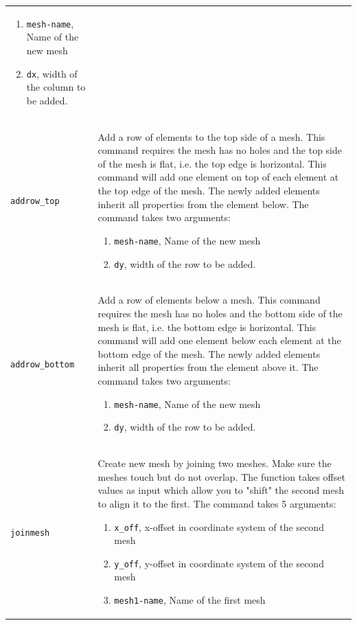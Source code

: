 \documentclass[noshowpacs,preprintnumbers,amsmath,amssymb, letter]{revtex4}
\begin{document}
\begin{longtable}{p{}p{}}
\begin{enumerate}
\item \texttt{mesh-name}, Name of the new mesh
\item \texttt{dx}, width of the column to be added. 
\end{enumerate}\\
\texttt{addrow\_top} 	& Add a row of elements to the top side of a mesh. This command requires the mesh has no holes and the top side of the mesh is flat, i.e. the top edge is horizontal. This command will add one element on top of each element at the top edge of the mesh. The newly added elements inherit all properties from the element below. The command takes two arguments:
\begin{enumerate}
\item \texttt{mesh-name}, Name of the new mesh
\item \texttt{dy}, width of the row to be added. 
\end{enumerate}\\
\texttt{addrow\_bottom} 	& Add a row of elements below a mesh. This command requires the mesh has no holes and the bottom side of the mesh is flat, i.e. the bottom edge is horizontal. This command will add one element below each element at the bottom edge of the mesh. The newly added elements inherit all properties from the element above it. The command takes two arguments:
\begin{enumerate}
\item \texttt{mesh-name}, Name of the new mesh
\item \texttt{dy}, width of the row to be added. 
\end{enumerate}\\
\texttt{joinmesh}	& Create new mesh by joining two meshes. Make sure the meshes touch but do not overlap. The function takes offset values as input which allow you to "shift" the second mesh to align it to the first. The command takes 5 arguments:
\begin{enumerate}
\item \texttt{x\_off}, x-offset in coordinate system of the second mesh
\item \texttt{y\_off}, y-offset in coordinate system of the second mesh 
\item \texttt{mesh1-name}, Name of the first mesh

\end{enumerate}
\end{longtable}
\end{document}
